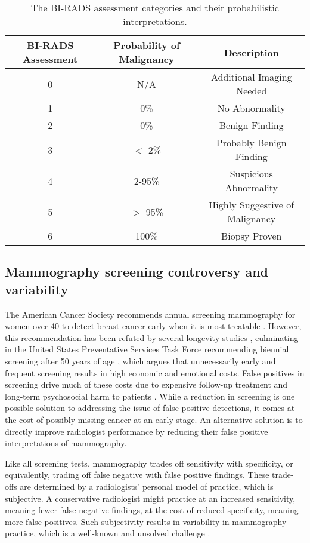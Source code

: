 \begin{table}[ht!]
\centering
\begin{tabular}{|c|c|c|}
	\hline  BI-RADS Assessment&  Probability of Malignancy & Description \\ 
	\hline\hline
	0& N/A & Additional Imaging Needed \\ 
	\hline
	1& 0\% & No Abnormality \\ 
	\hline  
	2& 0\% & Benign Finding  \\ 
	\hline  
	3& $<$ 2\% & Probably Benign Finding \\ 
	\hline  
	4& 2-95\% & Suspicious Abnormality \\ 
	\hline  
	5& $>$ 95\% & Highly Suggestive of Malignancy \\ 
	\hline  
	6& 100\% & Biopsy Proven \\ 
	\hline 
\end{tabular}
\caption{The BI-RADS assessment categories and their probabilistic interpretations.}
\label{table:birads}
\end{table}

\subsection{Mammography screening controversy and variability}
The American Cancer Society recommends annual screening mammography for women over 40 to detect breast cancer early when it is most treatable \cite{Nystrom:2002hb, Smith:2003en, Smart:1997hk}. However, this recommendation has been refuted by several longevity studies \cite{Bleyer:2012dc, Kalager:2012ez},  culminating in the United States Preventative Services Task Force recommending biennial screening after 50 years of age \cite{Kerlikowske:2013ej, Anonymous:2009fl}, which argues that unnecessarily early and frequent screening results in high economic and emotional costs.  False positives in screening drive much of these costs due to expensive follow-up treatment and long-term psychosocial harm to patients \cite{Kerlikowske:2013ej, Brodersen:2013kq}. While a reduction in screening is one possible solution to addressing the issue of false positive detections, it comes at the cost of possibly missing cancer at an early stage. An alternative solution is to directly improve radiologist performance by reducing their false positive interpretations of mammography. 

Like all screening tests, mammography trades off sensitivity with specificity, or equivalently, trading off false negative with false positive findings. These trade-offs are determined by a radiologists' personal model of practice, which is subjective. A conservative radiologist might practice at an increased sensitivity, meaning fewer false negative findings, at the cost of reduced specificity, meaning more false positives. Such subjectivity results in variability in mammography practice, which is a well-known and unsolved challenge \cite{Elmore:2009vu, Elmore:2012er, Beam:1996ui, Taplin:2008bv}. 

